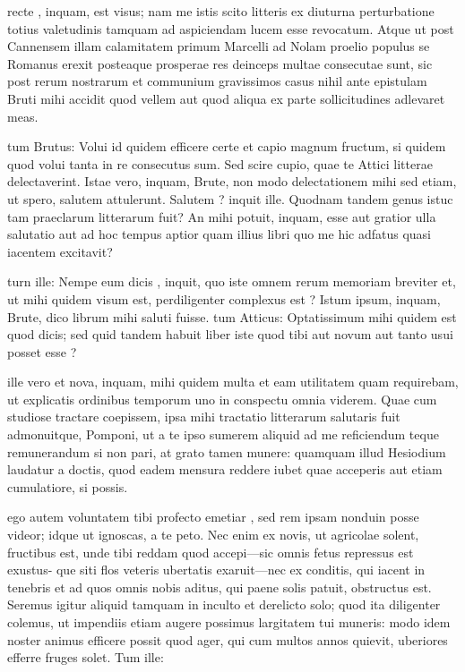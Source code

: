  recte , inquam, est visus; nam me istis scito litteris ex diuturna perturbatione totius valetudinis tamquam ad aspiciendam lucem esse revocatum. Atque ut post Cannensem illam calamitatem primum Marcelli ad Nolam proelio populus se Romanus erexit posteaque prosperae res deinceps multae consecutae sunt, sic post rerum nostrarum et communium gravissimos casus nihil ante epistulam Bruti mihi accidit quod vellem aut quod aliqua ex parte sollicitudines adlevaret meas.

 tum Brutus: Volui id quidem efficere certe et capio magnum fructum, si quidem quod volui tanta in re consecutus sum. Sed scire cupio, quae te Attici litterae delectaverint. Istae vero, inquam, Brute, non modo delectationem mihi sed etiam, ut spero, salutem attulerunt. Salutem ? inquit ille. Quodnam tandem genus istuc tam praeclarum litterarum fuit? An mihi potuit, inquam, esse aut gratior ulla salutatio aut ad hoc tempus aptior quam illius libri quo me hic adfatus quasi iacentem excitavit?

 turn ille: Nempe eum dicis , inquit, quo iste omnem rerum memoriam breviter et, ut mihi quidem visum est, perdiligenter complexus est ? Istum ipsum, inquam, Brute, dico librum mihi saluti fuisse. tum Atticus: Optatissimum mihi quidem est quod dicis; sed quid tandem habuit liber iste quod tibi aut novum aut tanto usui posset esse ?

 ille vero et nova, inquam, mihi quidem multa et eam utilitatem quam requirebam, ut explicatis ordinibus temporum uno in conspectu omnia viderem. Quae cum studiose tractare coepissem, ipsa mihi tractatio litterarum salutaris fuit admonuitque, Pomponi, ut a te ipso sumerem aliquid ad me reficiendum teque remunerandum si non pari, at grato tamen munere: quamquam illud Hesiodium laudatur a doctis, quod eadem mensura reddere iubet quae acceperis aut etiam cumulatiore, si possis.

 ego autem voluntatem tibi profecto emetiar , sed rem ipsam nonduin posse videor; idque ut ignoscas, a te peto. Nec enim ex novis, ut agricolae solent, fructibus est, unde tibi reddam quod accepi—sic omnis fetus repressus est exustus- que siti flos veteris ubertatis exaruit—nec ex conditis, qui iacent in tenebris et ad quos omnis nobis aditus, qui paene solis patuit, obstructus est. Seremus igitur aliquid tamquam in inculto et derelicto solo; quod ita diligenter colemus, ut impendiis etiam augere possimus largitatem tui muneris: modo idem noster animus efficere possit quod ager, qui cum multos annos quievit, uberiores efferre fruges solet. Tum ille:

